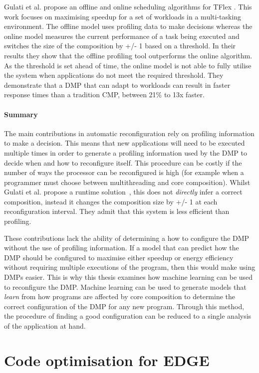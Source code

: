 Gulati et al. propose an offline and online scheduling algorithms for TFlex \cite{gulati2008multitaskingdmc}. 
This work focuses on maximising speedup for a set of workloads in a multi-tasking environment.
The offline model uses profiling data to make decisions whereas the online model measures the current performance of a task being executed and switches the size of the composition by +/- 1 based on a threshold.
In their results they show that the offline profiling tool outperforms the online algorithm.
As the threshold is set ahead of time, the online model is not able to fully utilise the system when applications do not meet the required threshold.
They demonstrate that a DMP that can adapt to workloads can result in faster response times than a tradition CMP, between 21\% to 13x faster.

\paragraph*{Summary}
The main contributions in automatic reconfiguration rely on profiling information to make a decision.
This means that new applications will need to be executed multiple times in order to generate a profiling information used by the DMP to decide when and how to reconfigure itself.
This procedure can be costly if the number of ways the processor can be reconfigured is high (for example when a programmer must choose between multithreading and core composition).
Whilst Gulati et al. propose a runtime solution~\cite{gulati2008multitaskingdmc}, this does not \textit{directly} infer a correct composition, instead it changes the composition size by +/- 1 at each reconfiguration interval.
They admit that this system is less efficient than profiling.

These contributions lack the ability of determining a how to configure the DMP without the use of profiling information.
If a model that can predict how the DMP should be configured to maximise either speedup or energy efficiency without requiring multiple executions of the program, then this would make using DMPs easier.
This is why this thesis examines how machine learning can be used to reconfigure the DMP.
Machine learning can be used to generate models that \textit{learn} from how programs are affected by core composition to determine the correct configuration of the DMP for any new program.
Through this method, the procedure of finding a good configuration can be reduced to a single analysis of the application at hand.

\section{Code optimisation for EDGE}

